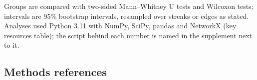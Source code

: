 Groups are compared with two-sided Mann--Whitney U tests and Wilcoxon tests; intervals are 95\% bootstrap intervals, resampled over streaks or edges as stated.
Analyses used Python 3.11 with NumPy, SciPy, pandas and NetworkX (key resources table); the script behind each number is named in the supplement next to it.

\subsection*{Methods references}


